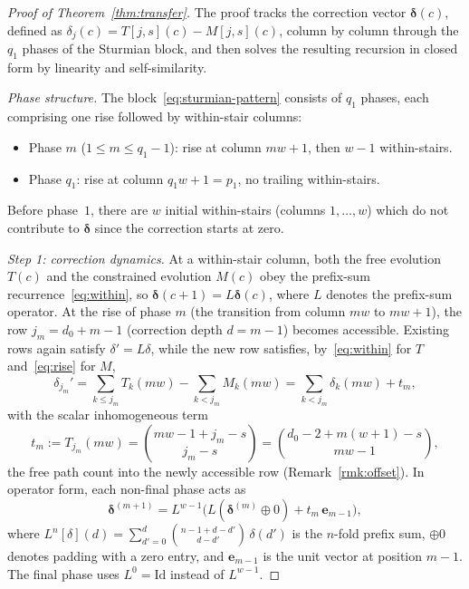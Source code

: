 \documentclass[11pt]{article}
\theoremstyle{definition}
\theoremstyle{remark}
\begin{document}
\begin{proof}[Proof of Theorem~\ref{thm:transfer}]
The proof tracks the correction vector $\boldsymbol{\delta}(c)$,
defined as $\delta_j(c) = T[j, s](c) - M[j, s](c)$, column by
column through the $q_1$ phases of the Sturmian block, and then
solves the resulting recursion in closed form by linearity and
self-similarity.

\emph{Phase structure.}
The block~\eqref{eq:sturmian-pattern} consists of $q_1$ phases,
each comprising one rise followed by within-stair columns:
\begin{itemize}
\item Phase $m$ ($1 \leq m \leq q_1 - 1$): rise at column
  $mw + 1$, then $w - 1$ within-stairs.
\item Phase $q_1$: rise at column $q_1 w + 1 = p_1$, no
  trailing within-stairs.
\end{itemize}
Before phase~$1$, there are $w$ initial within-stairs (columns
$1, \ldots, w$) which do not contribute to $\boldsymbol{\delta}$
since the correction starts at zero.

\emph{Step 1: correction dynamics.}
At a within-stair column, both the free evolution $T(c)$ and the
constrained evolution $M(c)$ obey the prefix-sum
recurrence~\eqref{eq:within}, so
$\boldsymbol{\delta}(c{+}1) = L\boldsymbol{\delta}(c)$, where $L$
denotes the prefix-sum operator.
At the rise of phase $m$ (the transition from column $mw$ to
$mw + 1$), the row $j_m = d_0 + m - 1$ (correction depth
$d = m - 1$) becomes accessible.
Existing rows again satisfy $\delta' = L\delta$, while the new
row satisfies, by~\eqref{eq:within} for $T$ and~\eqref{eq:rise}
for $M$,
\[
  \delta_{j_m}' = \sum_{k \leq j_m} T_k(mw)
   - \sum_{k < j_m} M_k(mw)
  = \sum_{k < j_m} \delta_k(mw) + t_m,
\]
with the scalar inhomogeneous term
\[
  t_m := T_{j_m}(mw) = \binom{mw - 1 + j_m - s}{j_m - s}
  = \binom{d_0 - 2 + m(w{+}1) - s}{mw - 1},
\]
the free path count into the newly accessible row
(Remark~\ref{rmk:offset}).
In operator form, each non-final phase acts as
\begin{equation}\label{eq:phase-op}
  \boldsymbol{\delta}^{(m+1)} = L^{w-1}\bigl(
    L(\boldsymbol{\delta}^{(m)} \oplus 0)
    + t_m\, \mathbf{e}_{m-1}\bigr),
\end{equation}
where $L^n[\delta](d) = \sum_{d'=0}^{d}
\binom{n-1+d-d'}{d-d'}\,\delta(d')$ is the $n$-fold prefix sum,
$\oplus 0$ denotes padding with a zero entry, and
$\mathbf{e}_{m-1}$ is the unit vector at position $m - 1$.
The final phase uses $L^0 = \mathrm{Id}$ instead of $L^{w-1}$.


\end{proof}
\end{document}
